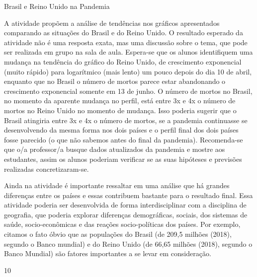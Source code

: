 \clearmargin
\begin{sugestions}{Brasil e Reino Unido na Pandemia}
{
	A atividade propõem a análise de tendências nos gráficos apresentados comparando as situações do Brasil e do Reino Unido. O resultado esperado da atividade não é uma resposta exata, mas uma discussão sobre o tema, que pode ser realizada em grupo na sala de aula. Espera-se que os alunos identifiquem uma mudança na tendência do gráfico do Reino Unido, de crescimento exponencial (muito rápido) para logarítmico (mais lento) um pouco depois do dia 10 de abril, enquanto que no Brasil o número de mortos parece estar abandonando o crescimento exponencial somente em 13 de junho. O número de mortos no Brasil, no momento da aparente mudança no perfil, está entre 3x e 4x o número de mortos no Reino Unido no momento de mudança. Isso poderia sugerir que o Brasil atingiria entre 3x e 4x o número de mortos, se a pandemia continuasse se  desenvolvendo da mesma forma nos dois países e o perfil final dos dois países fosse parecido (o que não sabemos antes do final da pandemia). Recomenda-se que o/a professor/a busque dados atualizados da pandemia e mostre aos estudantes, assim os alunos poderiam verificar se as suas hipóteses e previsões realizadas concretizaram-se.

	Ainda na atividade é importante ressaltar em uma análise que há grandes diferenças entre os países e essas contribuem bastante para o resultado final. Essa atividade poderia ser desenvolvida de forma interdisciplinar com a disciplina de geografia, que poderia explorar diferenças demográficas, sociais, dos sistemas de saúde, socio-econômicas e das reações socio-políticas dos países. Por exemplo, citamos o fato óbvio que as populações do Brasil (de 209,5 milhões (2018), segundo o Banco mundial) e do Reino Unido (de 66,65 milhões (2018), segundo o Banco Mundial) são fatores importantes a se levar em consideração.
}{1}{0}
\end{sugestions}

